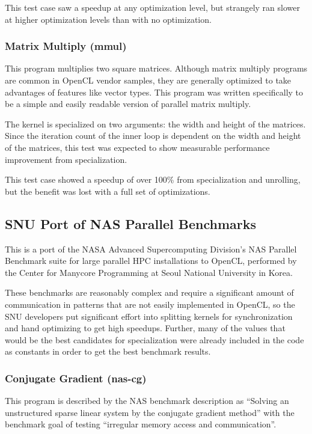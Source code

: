\documentclass{acm_proc_article-sp}
\begin{document}
This test case saw a speedup at any optimization level, but strangely ran
slower at higher optimization levels than with no optimization.

\subsubsection{Matrix Multiply (mmul)}

This program multiplies two square matrices. Although matrix multiply programs
are common in OpenCL vendor samples, they are generally optimized to take
advantages of features like vector types. This program was written specifically
to be a simple and easily readable version of parallel matrix multiply.

The kernel is specialized on two arguments: the width and height of the
matrices. Since the iteration count of the inner loop is dependent on the width
and height of the matrices, this test was expected to show measurable
performance improvement from specialization.

This test case showed a speedup of over 100\% from specialization and
unrolling, but the benefit was lost with a full set of optimizations.

\subsection{SNU Port of NAS Parallel Benchmarks}

This is a port of the NASA Advanced Supercomputing Division's NAS Parallel
Benchmark\cite{Van:2002:NAS} suite for large parallel HPC installations to
OpenCL, performed by the Center for Manycore Programming at Seoul National
University in Korea\cite{Seo:2011:NASPerf}.

These benchmarks are reasonably complex and require a significant amount of
communication in patterns that are not easily implemented in OpenCL, so the SNU
developers put significant effort into splitting kernels for synchronization
and hand optimizing to get high speedups. Further, many of the values that
would be the best candidates for specialization were already included in the
code as constants in order to get the best benchmark results. 

\subsubsection{Conjugate Gradient (nas-cg)}

This program is described by the NAS benchmark description as ``Solving an
unstructured sparse linear system by the conjugate gradient method'' with the
benchmark goal of testing ``irregular memory access and communication''.
\end{document}

